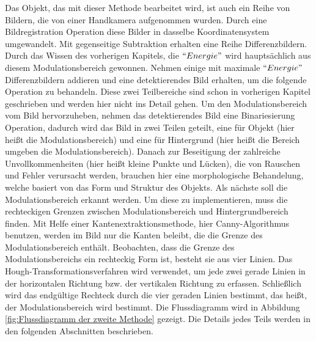 Das Objekt, das mit dieser Methode bearbeitet wird, ist auch ein Reihe von Bildern, die von einer Handkamera aufgenommen wurden. Durch eine Bildregistration Operation diese Bilder in dasselbe Koordinatensystem umgewandelt. Mit gegenseitige Subtraktion erhalten eine Reihe Differenzbildern. Durch das Wissen des vorherigen Kapitels, die $``Energie"$ wird hauptsächlich aus diesem Modulationsbereich gewonnen. Nehmen einige mit maximale $``Energie"$ Differenzbildern addieren und eine detektierendes Bild erhalten, um die folgende Operation zu behandeln. Diese zwei Teilbereiche sind schon in vorherigen Kapitel geschrieben und werden hier nicht ins Detail gehen. Um den Modulationsbereich vom Bild hervorzuheben, nehmen das detektierendes Bild eine Binariesierung Operation, dadurch wird das Bild in zwei Teilen geteilt, eine für Objekt (hier heißt die Modulationsbereich) und eine für Hintergrund (hier heißt die Bereich umgeben die Modulationsbereich). Danach zur Beseitigung der zahlreiche Unvollkommenheiten (hier heißt kleine Punkte und Lücken), die von Rauschen und Fehler verursacht werden, brauchen hier eine morphologische Behandelung, welche basiert von das Form und Struktur des Objekts. Als nächste soll die Modulationsbereich erkannt werden. Um diese zu implementieren, muss die rechteckigen Grenzen zwischen Modulationsbereich und Hintergrundbereich finden. Mit Helfe einer Kantenextraktionsmethode, hier Canny-Algorithmus benutzen, werden im Bild nur die Kanten beleibt, die die Grenze des Modulationsbereich enthält. Beobachten, dass die Grenze des Modulationsbereichs ein rechteckig Form ist, besteht sie aus vier Linien. Das Hough-Transformationsverfahren wird verwendet, um jede zwei gerade Linien in der horizontalen Richtung bzw. der vertikalen Richtung zu erfassen. Schließlich wird das endgültige Rechteck durch die vier geraden Linien bestimmt, das heißt, der Modulationsbereich wird bestimmt. Die Flussdiagramm wird in Abbildung \ref{fig:Flussdiagramm der zweite Methode} gezeigt. Die Details jedes Teils werden in den folgenden Abschnitten beschrieben.

